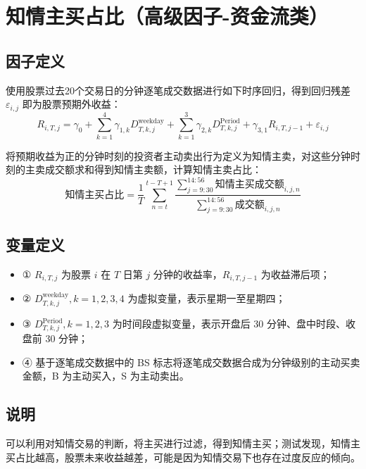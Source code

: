 \documentclass{article}
\begin{document}
\section{知情主买占比（高级因子-资金流类）}

\subsection{因子定义}


使用股票过去20个交易日的分钟逐笔成交数据进行如下时序回归，得到回归残差 \( \varepsilon_{i,j} \) 即为股票预期外收益：
\begin{equation}
    R_{i,T,j} = \gamma_0 + \sum_{k=1}^4 \gamma_{1,k} D_{T,k,j}^{\mathrm{weekday}} + \sum_{k=1}^3 \gamma_{2,k} D_{T,k,j}^{\mathrm{Period}} + \gamma_{3,1} R_{i,T,j-1} + \varepsilon_{i,j}
\end{equation}

将预期收益为正的分钟时刻的投资者主动卖出行为定义为知情主卖，对这些分钟时刻的主卖成交额求和得到知情主卖额，计算知情主卖占比：
\begin{equation}
    \text{知情主买占比} = \frac{1}{T} \sum_{n=t}^{t-T+1}  \frac{\sum_{j=9:30}^{14:56} \text{知情主买成交额}_{i,j,n} }{ \sum_{j=9:30}^{14:56} \text{成交额}_{i,j,n} }
\end{equation}

\subsection{变量定义}
\begin{itemize}
    \item ① \( R_{i,T,j} \) 为股票 \( i \) 在 \( T \) 日第 \( j \) 分钟的收益率，\( R_{i,T,j-1} \) 为收益滞后项；
    \item ② \( D_{T,k,j}^{\mathrm{weekday}}, k=1,2,3,4 \) 为虚拟变量，表示星期一至星期四；
    \item ③ \( D_{T,k,j}^{\mathrm{Period}}, k=1,2,3 \) 为时间段虚拟变量，表示开盘后 30 分钟、盘中时段、收盘前 30 分钟；
    \item ④ 基于逐笔成交数据中的 BS 标志将逐笔成交数据合成为分钟级别的主动买卖金额，B 为主动买入，S 为主动卖出。
\end{itemize}

\subsection{说明}
可以利用对知情交易的判断，将主买进行过滤，得到知情主买；测试发现，知情主买占比越高，股票未来收益越差，可能是因为知情交易下也存在过度反应的倾向。
\end{document}
